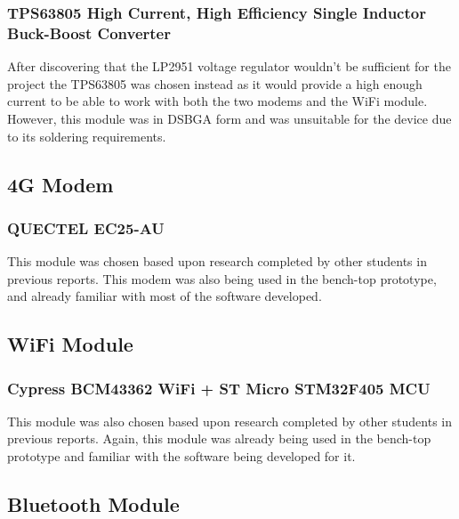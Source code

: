 \subsubsection{TPS63805 High Current, High Efficiency Single Inductor Buck-Boost Converter}

After discovering that the LP2951 voltage regulator wouldn't be sufficient for the project the TPS63805 was chosen instead as it would provide a high enough current to be able to work with both the two modems and the WiFi module. However, this module was in DSBGA form and was unsuitable for the device due to its soldering requirements. 



\subsection{4G Modem}
\subsubsection{ QUECTEL EC25-AU}

	This module was chosen based upon research completed by other students in previous reports. This modem was also being used in the bench-top prototype, and already familiar with most of the software developed. 

\subsection{WiFi Module}
\subsubsection{Cypress BCM43362 WiFi + ST Micro STM32F405 MCU}
		This module was also chosen based upon research completed by other students in previous reports. Again, this module was already being used in the bench-top prototype and familiar with the software being developed for it. 


\subsection{Bluetooth Module}
